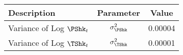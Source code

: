   \begin{center}
  \begin{tabular}{lcc}
    \toprule
    Description                 & Parameter                & Value    \\     \midrule
    Variance of Log $\PShk_{t}$ & $\sigma^{2}_{\PShk}$ & 0.00004  \\
    Variance of Log $\TShk_{t}$ & $\sigma^{2}_{\TShk}$ & 0.00001  \\
    \bottomrule
  \end{tabular}
  \end{center}
